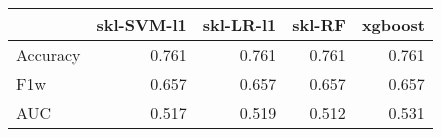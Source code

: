 \begin{tabular}{lrrrr}
\toprule
{} &  skl-SVM-l1 &  skl-LR-l1 &  skl-RF &  xgboost \\
\midrule
Accuracy &       0.761 &      0.761 &   0.761 &    0.761 \\
F1w      &       0.657 &      0.657 &   0.657 &    0.657 \\
AUC      &       0.517 &      0.519 &   0.512 &    0.531 \\
\bottomrule
\end{tabular}
